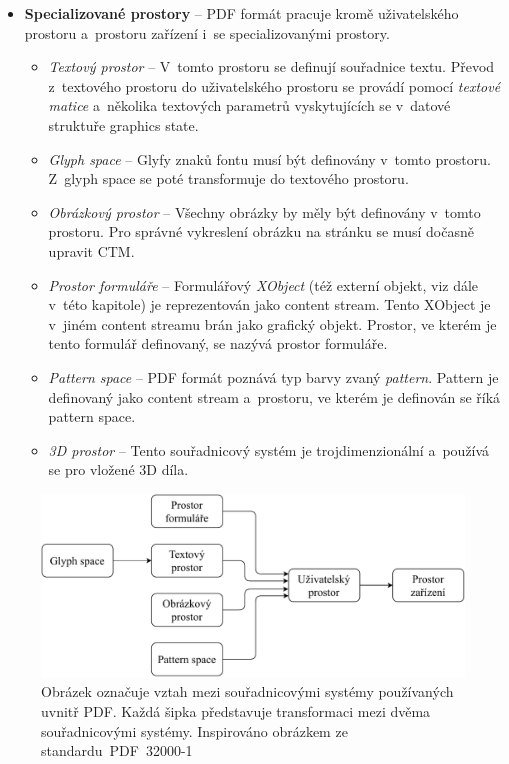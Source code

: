\begin{itemize}
    \item \textbf{Specializované prostory} -- PDF formát pracuje kromě
    uživatelského prostoru a~prostoru zařízení i~se specializovanými prostory.
    \begin{itemize}
        \item \emph{Textový prostor} -- V~tomto prostoru se definují souřadnice
        textu. Převod z~textového prostoru do uživatelského prostoru se provádí
        pomocí \emph{textové matice} a~několika textových parametrů vyskytujících
        se v~datové struktuře graphics state.

        \item \emph{Glyph space} -- Glyfy znaků fontu musí být definovány v~tomto
        prostoru. Z~glyph space se poté transformuje do textového prostoru.
        
        \item \emph{Obrázkový prostor} -- Všechny obrázky by měly být definovány
        v~tomto prostoru. Pro správné vykreslení obrázku na stránku se musí dočasně
        upravit CTM.

        \item \emph{Prostor formuláře} -- Formulářový \emph{XObject} (též externí
        objekt, viz dále v~této kapitole) je
        reprezentován jako content stream. Tento XObject je v~jiném content streamu
        brán jako grafický objekt. Prostor, ve kterém je tento formulář definovaný,
        se nazývá prostor formuláře.

        \item \emph{Pattern space} -- PDF formát poznává typ barvy zvaný
        \emph{pattern}. Pattern je definovaný jako content stream a~prostoru, ve
        kterém je definován se říká pattern space.
        
        \item \emph{3D prostor} -- Tento souřadnicový systém je
        trojdimenzionální a~používá se pro vložené 3D díla.
    \end{itemize}
\end{itemize}

\begin{figure}[H]
    \includegraphics[width=\linewidth]{obrazky-figures/coordinate_spaces.pdf}
    \caption[Vztah mezi souřadnicovými systémy používaných uvnitř PDF]{Obrázek označuje vztah mezi souřadnicovými systémy používaných uvnitř PDF. Každá šipka představuje transformaci mezi dvěma souřadnicovými systémy. Inspirováno obrázkem ze standardu~PDF~32000-1~\cite{PDF32000-1:2008}}
    \label{coordinate_spaces}
\end{figure}


